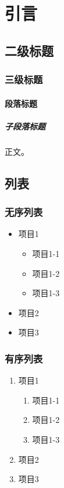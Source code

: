 \section{引言}\label{sec:introduction}

\subsection{二级标题}

\subsubsection{三级标题}

\paragraph{段落标题}

\subparagraph{子段落标题}

正文。

\subsection{列表}

\subsubsection{无序列表}

\begin{itemize}
    \item 项目1
          \begin{itemize}
              \item 项目1-1
              \item 项目1-2
              \item 项目1-3
          \end{itemize}
    \item 项目2
    \item 项目3
\end{itemize}

\subsubsection{有序列表}

\begin{enumerate}
    \item 项目1
          \begin{enumerate}
              \item 项目1-1
              \item 项目1-2
              \item 项目1-3
          \end{enumerate}
    \item 项目2
    \item 项目3
\end{enumerate}

